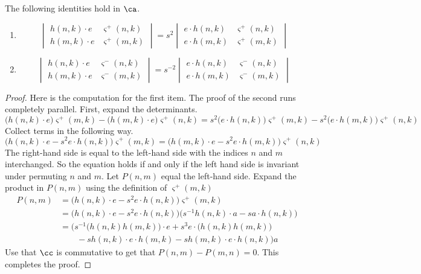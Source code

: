 \begin{lemma} \label{lemma:detgymnastics3}
The following identities hold in $\ca$. 
\leavevmode 
\begin{enumerate}
\item
\begin{equation*}
\begin{vmatrix}
h(n, k) \cdot e & \varsigma^+ (n, k) \\
h(m, k) \cdot e & \varsigma^+ (m, k)
\end{vmatrix}
= s^2
\begin{vmatrix}
e \cdot h(n, k) & \varsigma^+ (n, k) \\
e \cdot h(m, k) & \varsigma^+ (m, k)
\end{vmatrix}
\end{equation*}
\item
\begin{equation*}
\begin{vmatrix}
h(n, k) \cdot e & \varsigma^- (n, k) \\
h(m, k) \cdot e & \varsigma^- (m, k) 
\end{vmatrix}
= s^{-2}
\begin{vmatrix}
e \cdot h(n, k) & \varsigma^- (n, k) \\
e \cdot h(m, k) & \varsigma^- (m, k) 
\end{vmatrix}
\end{equation*}
\end{enumerate}
\end{lemma}

\begin{proof}
Here is the computation for the first item. The proof of the second runs completely parallel. First, expand the determinants.
\[
\big( h(n, k) \cdot e \big) \varsigma^+ (m, k) - \big( h(m, k) \cdot e \big) \varsigma^+ (n, k) = s^2 \big( e \cdot h(n, k) \big) \varsigma^+ (m, k) - s^2 \big( e \cdot h(m, k) \big) \varsigma^+ (n, k)
\]
Collect terms in the following way.
\[
\big( h(n, k) \cdot e - s^2 e \cdot h(n, k) \big) \varsigma^+ (m, k) = \big( h(m, k) \cdot e - s^2 e \cdot h(m, k) \big) \varsigma^+(n, k)
\]
The right-hand side is equal to the left-hand side with the indices $n$ and $m$ interchanged. So the equation holds if and only if the left hand side is invariant under permuting $n$ and $m$. Let $P(n,m)$ equal the left-hand side. Expand the product in $P(n, m)$ using the definition of $\varsigma^+(m, k)$
\begin{align*}
P(n, m) & = \big( h(n, k) \cdot e - s^2 e \cdot h(n, k) \big) \varsigma^+ (m, k) \\
& = \big( h(n, k) \cdot e - s^2 e \cdot h(n, k) \big) \big( s^{-1} h(n, k) \cdot a - s a \cdot h(n, k) \big) \\
& = \Big( s^{-1} \big( h(n, k) h(m, k) \big) \cdot e + s^3 e \cdot \big( h(n, k) h(m, k) \big) \\
& \qquad  - s h(n, k) \cdot e \cdot h(m, k) - s h(m, k) \cdot e \cdot h(n, k) \Big) a
\end{align*}
Use that $\cc$ is commutative to get that $P(n, m) - P(m, n) = 0$. This completes the proof. 
\end{proof}

